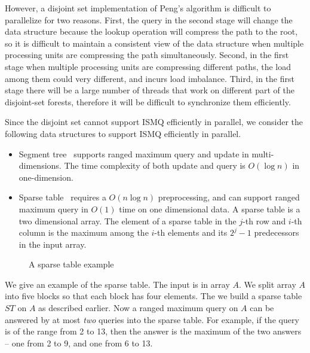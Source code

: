 
However, a disjoint set implementation of Peng's algorithm is difficult
to parallelize for two reasons.  First, the query in the second stage
will change the data structure because the lookup operation will
compress the path to the root, so it is difficult to maintain a
consistent view of the data structure when multiple processing units are
compressing the path simultaneously.  Second, in the first stage when
multiple processing units are compressing different paths, the load
among them could very different, and incurs load imbalance.  Third, in
the first stage there will be a large number of threads that work on
different part of the disjoint-set forests, therefore it will be
difficult to synchronize them efficiently.

Since the disjoint set cannot support ISMQ efficiently in parallel, we
consider the following data structures to support ISMQ efficiently in
parallel.

\begin{itemize}
  \item Segment tree~\cite{berg2000computational} supports ranged
    maximum query and update in multi-dimensions.  The time complexity
    of both update and query is $O(\log n)$ in one-dimension.
  \item Sparse table~\cite{Berkman1993RecursiveSP} requires a $O(n
    \log n)$ preprocessing, and can support ranged maximum query in
    $O(1)$ time on one dimensional data.  A sparse table is a two
    dimensional array.  The element of a sparse table in the $j$-th
    row and $i$-th column is the maximum among the $i$-th elements
    and its $2^j - 1$ predecessors in the input array.
\end{itemize}

\begin{figure}[!thb]
  \centering {} 
  \caption{A sparse table example}
  \label{fig:interval-decomposition}
\end{figure}

We give an example of the sparse table.  The input is in array $A$. We
split array $A$ into five blocks so that each block has four elements.
The we build a sparse table $ST$ on $A$ as described earlier.  Now a
ranged maximum query on $A$ can be answered by at most {\em two}
queries into the sparse table.  For example, if the query is of the
range from 2 to 13, then the answer is the maximum of the two answers
-- one from 2 to 9, and one from 6 to 13.

